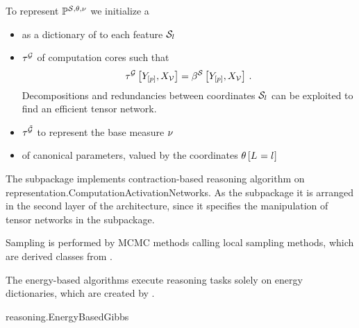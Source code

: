 \begin{example}
    To represent $\mathbb{P}^{\mathcal{S},\theta,\nu}$ we initialize a
    \begin{itemize}
        \item {} as a dictionary of  to each feature $\mathcal{S}_{l}$
        \item {} $\tau^{\mathcal{G}}$ of computation cores such that
        \begin{align*}
            \tau^{\mathcal{G}}\left[Y_{[p]},X_{\mathcal{V}}\right] = \beta^{\mathcal{S}}\left[Y_{[p]},X_{\mathcal{V}}\right] \, .
        \end{align*}
        Decompositions and redundancies between coordinates $\mathcal{S}_{l}$ can be exploited to find an efficient tensor network.
        \item {} $\tau^{\tilde{\mathcal{G}}}$ to represent the base measure $\nu$
        \item {} of canonical parameters, valued by the coordinates $\theta\left[L_{}=l_{}\right]$
    \end{itemize}
\end{example}



\label{sec:implementationReasoning}


The \spreasoning subpackage implements contraction-based reasoning algorithm on representation.ComputationActivationNetworks.
As the \sprepresentation subpackage it is arranged in the second layer of the \tnreason architecture, since it specifies the manipulation of tensor networks in the \spengine subpackage.


Sampling is performed by MCMC methods calling local sampling methods, which are derived classes from .

The energy-based algorithms execute reasoning tasks solely on energy dictionaries, which are created by .
\begin{centeredcode}
    reasoning.EnergyBasedGibbs
\end{centeredcode}


